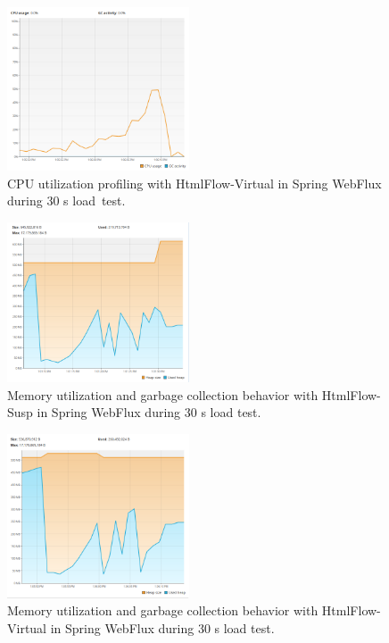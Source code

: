 \documentclass[software,article,accept,pdftex,moreauthors]{Definitions/mdpi}
\begin{document}
\begin{figure}[H]

     \includegraphics[width=0.48\textwidth]{./Graphs/cpu-virt.png}
     \caption{CPU utilization profiling with HtmlFlow-Virtual in Spring WebFlux during 30 s load~test.}   \label{fig:cpu-virt}
\end{figure}
     

\begin{figure}[H]
\vspace{-6pt}
    \includegraphics[width=0.48\textwidth]{./Graphs/mem-susp.png}
     \caption{Memory utilization and garbage collection behavior with HtmlFlow-Susp in Spring WebFlux during 30 s load test.}             \label{fig:gc-susp}
\end{figure}
     
     \begin{figure}[H]
\vspace{-6pt}
   \includegraphics[width=0.48\textwidth]{./Graphs/mem-virt.png}
     \caption{Memory utilization and garbage collection behavior with HtmlFlow-Virtual in Spring WebFlux during 30 s load test.} \label{fig:gc-virt}
\end{figure}
\end{document}
